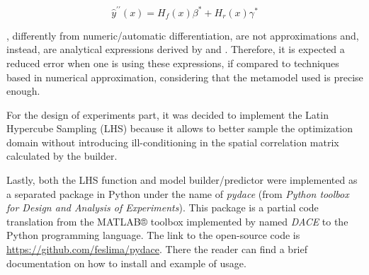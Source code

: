 \documentclass[../msc-thesis.tex]{subfiles}
\begin{document}
\begin{equation}
	\hat{y}^{\prime \prime}(x)=H_{f}(x) \beta^{*}+H_{r}(x) \gamma^{*}
	\label{eq:kr6}
\end{equation}

, differently from numeric/automatic differentiation, 
are not approximations and, instead, are analytical expressions
derived by \textcite{Lophaven2002} and \textcite{Alves2018}. Therefore, it 
is expected a reduced error when one is using these expressions, if compared 
to techniques based in numerical approximation, considering that the \kriging 
metamodel used is precise enough.

For the design of experiments part, it was decided to implement the Latin 
Hypercube Sampling (LHS) because it allows to better sample the optimization 
domain without introducing ill-conditioning in the spatial correlation matrix 
calculated by the \kriging builder.

Lastly, both the LHS function and \kriging model builder/predictor were 
implemented as a separated package in Python under the name of \textit{pydace} 
(from \textit{Python toolbox for Design and Analysis of Experiments}). This 
package is a partial code translation from the MATLAB® toolbox implemented by 
\textcite{Lophaven2002} named \textit{DACE} to the Python programming 
language. The link to the open-source code is 
\url{https://github.com/feslima/pydace}. There the reader can find a brief 
documentation on how to install and example of usage.
\end{document}

